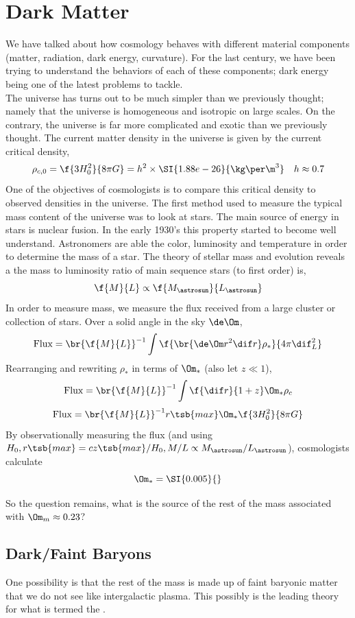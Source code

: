 \documentclass{article}
\begin{document}
\section{Dark Matter}
We have talked about how cosmology behaves with different material components (matter, radiation, dark energy, curvature). For the last century, we have been trying to understand the behaviors of each of these components; dark energy being one of the latest problems to tackle. \\

The universe has turns out to be much simpler than we previously thought; namely that the universe is homogeneous and isotropic on large scales. On the contrary, the universe is far more complicated and exotic than we previously thought. The current matter density in the universe is given by the current critical density,
\[ \rho_{c,0} = \f{3 H_0^2}{8 \pi G} = h^2\times\SI{1.88e-26}{\kg \per \m^3} \quad h \approx 0.7 \]
One of the objectives of cosmologists is to compare this critical density to observed densities in the universe. The first method used to measure the typical mass content of the universe was to look at stars. The main source of energy in stars is nuclear fusion. In the early 1930's this property started to become well understand. Astronomers are able the color, luminosity and temperature in order to determine the mass of a star. The theory of stellar mass and evolution reveals a the mass to luminosity ratio of main sequence stars (to first order) is,
\[ \f{M}{L} \propto \f{M_{\astrosun}}{L_{\astrosun}} \]
In order to measure mass, we measure the flux received from a large cluster or collection of stars. Over a solid angle in the sky $\de \Om$,
\[ \text{Flux} = \br{\f{M}{L}}^{-1} \int \f{\br{\de \Om r^2 \dif r} \rho_{*}}{4 \pi \dif^2_L} \]
Rearranging and rewriting $\rho_{*}$ in terms of $\Om_{*}$ (also let $z \ll 1$),
\[ \text{Flux} = \br{\f{M}{L}}^{-1} \int \f{ \dif r}{1 + z} \Om_{*} \rho_c \]
\[ \text{Flux} = \br{\f{M}{L}}^{-1} r\tsb{max} \Om_{*} \f{3H_0^2}{8 \pi G} \]
By observationally measuring the flux (and using $H_0, r\tsb{max} = cz\tsb{max} / H_0, M/L \propto M_{\astrosun} / L_{\astrosun}$), cosmologists calculate
\[ \Om_{*} = \SI{0.005}{} \]

So the question remains, what is the source of the rest of the mass associated with $\Om_{m} \approx 0.23$?
\subsection{Dark/Faint Baryons}
One possibility is that the rest of the mass is made up of faint baryonic matter that we do not see like intergalactic plasma. This possibly is the leading theory for what is termed the . \\
\end{document}

